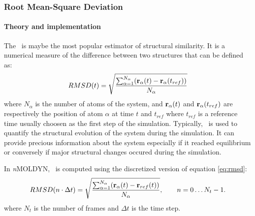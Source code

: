 \documentclass[a4paper,11pt]{report}
\newcommand{\NMOLDYN}{\textit{n}MOLDYN}
\begin{document}
\subsubsection{Root Mean-Square Deviation}
\label{rmsd}
\paragraph{Theory and implementation\\}
\label{rmsd_theory}
The \RMSD\ is maybe the most popular estimator of structural similarity. It is a 
numerical measure of the difference between two structures that can be defined as:
\begin{equation}
\label{eq:rmsd}
RMSD(t) = \sqrt{\frac{\sum_{\alpha = 1}^{N_{\alpha}}({\bf r}_{\alpha}(t) - {\bf r}_{\alpha}(t_{ref}))}{N_{\alpha}}}
\end{equation}
where $N_{\alpha}$ is the number of atoms of the system, and ${\bf r}_{\alpha}(t)$ and ${\bf r}_{\alpha}(t_{ref})$ are 
respectively the position of atom $\alpha$ at time $t$ and $t_{ref}$ where $t_{ref}$ is a reference time usually 
choosen as the first step of the simulation.
Typically, \RMSD\ is used to quantify the structural evolution of the system during the simulation. It can 
provide precious information about the system especially if it reached equilibrium or conversely if major
structural changes occured during the simulation.

In \NMOLDYN, \RMSD\ is computed using the discretized version of equation \ref{eq:rmsd}:
\begin{equation}
\label{eq:rmsd_num}
RMSD(n\cdot\Delta t) = \sqrt{\frac{\sum_{\alpha = 1}^{N_{\alpha}}({\bf r}_{\alpha}(t) - {\bf r}_{ref}(t))}{N_{\alpha}}},
\qquad n = 0\ldots N_t - 1.
\end{equation}
where $N_t$ is the number of frames and $\Delta t$ is the time step.
\end{document}

